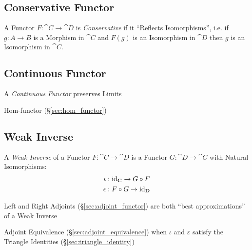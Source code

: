 \subsection{Conservative Functor}\label{sec:conservative_functor}

A Functor $F : \cat{C} \rightarrow \cat{D}$ is
\emph{Conservative} if it ``Reflects Isomorphisms'', i.e. if $g : A
\rightarrow B$ is a Morphism in $\cat{C}$ and $F(g)$ is an
Isomorphism in $\cat{D}$ then $g$ is an Isomorphism in
$\cat{C}$.



\subsection{Continuous Functor}\label{sec:continuous_functor}

A \emph{Continuous Functor} preserves Limits

Hom-functor (\S\ref{sec:hom_functor})



\subsection{Weak Inverse}\label{sec:weak_inverse}

A \emph{Weak Inverse} of a Functor $F : \cat{C} \rightarrow \cat{D}$
is a Functor $G : \cat{D} \rightarrow \cat{C}$ with Natural
Isomorphisms:
\begin{align*}
  \iota &: \mathrm{id}_\mathbf{C} \rightarrow G \circ F \\
  \epsilon &: F \circ G \rightarrow \mathrm{id}_\mathbf{D}
\end{align*}

Left and Right Adjoints (\S\ref{sec:adjoint_functor}) are both ``best
approximations'' of a Weak Inverse

Adjoint Equivalence (\S\ref{sec:adjoint_equivalence}) when $\iota$ and
$\varepsilon$ satisfy the Triangle Identities
(\S\ref{sec:triangle_identity})



